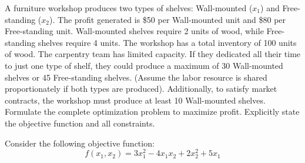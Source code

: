 \documentclass[12pt]{exam}
\begin{document}
        \begin{questions}
		

            \question[8] A furniture workshop produces two types of shelves: Wall-mounted ($x_1$) and Free-standing ($x_2$). The profit generated is \$50 per Wall-mounted unit and \$80 per Free-standing unit. Wall-mounted shelves require 2 units of wood, while Free-standing shelves require 4 units. The workshop has a total inventory of 100 units of wood. The carpentry team has limited capacity. If they dedicated all their time to just one type of shelf, they could produce a maximum of 30 Wall-mounted shelves or 45 Free-standing shelves. (Assume the labor resource is shared proportionately if both types are produced). Additionally, to satisfy market contracts, the workshop must produce at least 10 Wall-mounted shelves. Formulate the complete optimization problem to maximize profit. Explicitly state the objective function and all constraints.
           
           
             Consider the following objective function:
            \[ f(x_1, x_2) = 3x_1^2 - 4x_1x_2 + 2x_2^2 + 5x_1 \]
            
\end{questions}
\end{document}
